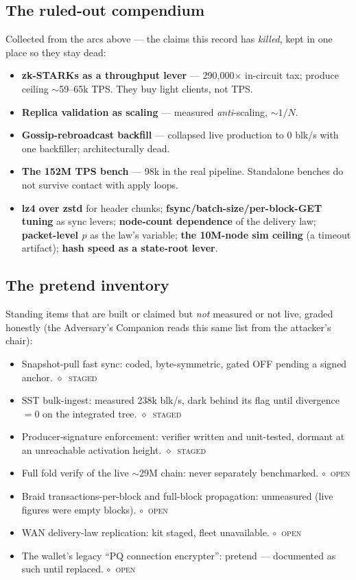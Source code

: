 \documentclass[10pt,a4paper]{article}
\newcommand{\stG}{\textcolor{sigilviolet}{$\diamond$}~{\scriptsize\textcolor{sigilviolet}{\textsc{staged}}}}
\newcommand{\stO}{\textcolor{sigilamber}{$\circ$}~{\scriptsize\textcolor{sigilamber}{\textsc{open}}}}
\begin{document}
\subsection{The ruled-out compendium}

\noindent Collected from the arcs above --- the claims this record has \emph{killed},
kept in one place so they stay dead:

\begin{itemize}[leftmargin=1.4em,itemsep=2pt]
\item \textbf{zk-STARKs as a throughput lever} --- 290{,}000$\times$ in-circuit tax;
  produce ceiling $\sim$59--65k TPS. They buy light clients, not TPS.
\item \textbf{Replica validation as scaling} --- measured \emph{anti}-scaling, $\sim 1/N$.
\item \textbf{Gossip-rebroadcast backfill} --- collapsed live production to 0 blk/s with
  one backfiller; architecturally dead.
\item \textbf{The 152M TPS bench} --- 98k in the real pipeline. Standalone benches do not
  survive contact with apply loops.
\item \textbf{lz4 over zstd} for header chunks; \textbf{fsync/batch-size/per-block-GET
  tuning} as sync levers; \textbf{node-count dependence} of the delivery law;
  \textbf{packet-level $p$} as the law's variable; \textbf{the 10M-node sim ceiling}
  (a timeout artifact); \textbf{hash speed as a state-root lever}.
\end{itemize}

\subsection{The pretend inventory}
\label{sec:pretend}

\noindent Standing items that are built or claimed but \emph{not} measured or not live,
graded honestly (the Adversary's Companion reads this same list from the attacker's
chair):

\begin{itemize}[leftmargin=1.4em,itemsep=2pt]
\item Snapshot-pull fast sync: coded, byte-symmetric, gated OFF pending a signed anchor. \stG
\item SST bulk-ingest: measured 238k blk/s, dark behind its flag until divergence $=0$ on
  the integrated tree. \stG
\item Producer-signature enforcement: verifier written and unit-tested, dormant at an
  unreachable activation height. \stG
\item Full fold verify of the live $\sim$29M chain: never separately benchmarked. \stO
\item Braid transactions-per-block and full-block propagation: unmeasured (live figures
  were empty blocks). \stO
\item WAN delivery-law replication: kit staged, fleet unavailable. \stO
\item The wallet's legacy ``PQ connection encrypter'': pretend --- documented as such
  until replaced. \stO
\end{itemize}
\end{document}
